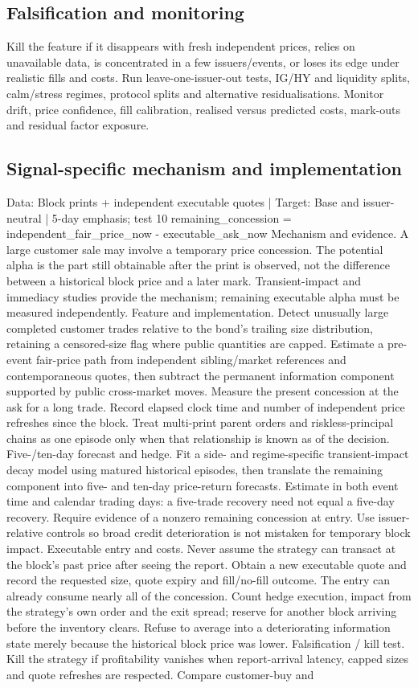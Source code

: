 \documentclass[10pt]{article}
\begin{document}
\subsection{Falsification and monitoring}
Kill the feature if it disappears with fresh independent prices, relies on unavailable data, is concentrated in a few issuers/events, or loses its edge under realistic fills and costs. Run leave-one-issuer-out tests, IG/HY and liquidity splits, calm/stress regimes, protocol splits and alternative residualisations. Monitor drift, price confidence, fill calibration, realised versus predicted costs, mark-outs and residual factor exposure.
\subsection{Signal-specific mechanism and implementation}
Data: Block prints + independent executable quotes  |  Target: Base and issuer-neutral  |  5-day emphasis; test 10 remaining\_concession = independent\_fair\_price\_now - executable\_ask\_now Mechanism and evidence.  A large customer sale may involve a temporary price concession. The potential alpha is the part still obtainable after the print is observed, not the difference between a historical block price and a later mark. Transient-impact and immediacy studies provide the mechanism; remaining executable alpha must be measured independently. Feature and implementation.  Detect unusually large completed customer trades relative to the bond’s trailing size distribution, retaining a censored-size flag where public quantities are capped. Estimate a pre-event fair-price path from independent sibling/market references and contemporaneous quotes, then subtract the permanent information component supported by public cross-market moves. Measure the present concession at the ask for a long trade. Record elapsed clock time and number of independent price refreshes since the block. Treat multi-print parent orders and riskless-principal chains as one episode only when that relationship is known as of the decision. Five-/ten-day forecast and hedge.  Fit a side- and regime-specific transient-impact decay model using matured historical episodes, then translate the remaining component into five- and ten-day price-return forecasts. Estimate in both event time and calendar trading days: a five-trade recovery need not equal a five-day recovery. Require evidence of a nonzero remaining concession at entry. Use issuer-relative controls so broad credit deterioration is not mistaken for temporary block impact. Executable entry and costs.  Never assume the strategy can transact at the block’s past price after seeing the report. Obtain a new executable quote and record the requested size, quote expiry and fill/no-fill outcome. The entry can already consume nearly all of the concession. Count hedge execution, impact from the strategy’s own order and the exit spread; reserve for another block arriving before the inventory clears. Refuse to average into a deteriorating information state merely because the historical block price was lower. Falsification / kill test.  Kill the strategy if profitability vanishes when report-arrival latency, capped sizes and quote refreshes are respected. Compare customer-buy and 
\end{document}
